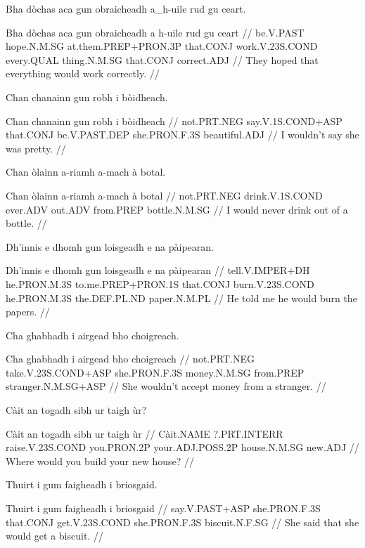 \documentclass[a4paper,10pt]{article}
\begin{document}
\ex
\begingl
\glpre Bha dòchas aca gun obraicheadh a\_h-uile rud gu ceart. 

\vspace{4mm}
\gla Bha dòchas aca gun obraicheadh {a h-uile} rud gu ceart  //
\glb be.V.PAST hope.N.M.SG at.them.PREP+PRON.3P that.CONJ work.V.23S.COND every.QUAL thing.N.M.SG that.CONJ correct.ADJ  //
\glft They hoped that everything would work correctly. //
\endgl
\xe

\ex
\begingl
\glpre Chan chanainn gun robh i bòidheach. 

\vspace{4mm}
\gla Chan chanainn gun robh i bòidheach  //
\glb not.PRT.NEG say.V.1S.COND+ASP that.CONJ be.V.PAST.DEP she.PRON.F.3S beautiful.ADJ  //
\glft I wouldn't say she was pretty. //
\endgl
\xe

\ex
\begingl
\glpre Chan òlainn a-riamh a-mach à botal. 

\vspace{4mm}
\gla Chan òlainn a-riamh a-mach à botal  //
\glb not.PRT.NEG drink.V.1S.COND ever.ADV out.ADV from.PREP bottle.N.M.SG  //
\glft I would never drink out of a bottle. //
\endgl
\xe

\ex
\begingl
\glpre Dh'innis e dhomh gun loisgeadh e na pàipearan. 

\vspace{4mm}
\gla Dh'innis e dhomh gun loisgeadh e na pàipearan  //
\glb tell.V.IMPER+DH he.PRON.M.3S to.me.PREP+PRON.1S that.CONJ burn.V.23S.COND he.PRON.M.3S the.DEF.PL.ND paper.N.M.PL  //
\glft He told me he would burn the papers. //
\endgl
\xe

\ex
\begingl
\glpre Cha ghabhadh i airgead bho choigreach. 

\vspace{4mm}
\gla Cha ghabhadh i airgead bho choigreach  //
\glb not.PRT.NEG take.V.23S.COND+ASP she.PRON.F.3S money.N.M.SG from.PREP stranger.N.M.SG+ASP  //
\glft She wouldn't accept money from a stranger. //
\endgl
\xe

\ex
\begingl
\glpre Càit an togadh sibh ur taigh ùr? 

\vspace{4mm}
\gla Càit an togadh sibh ur taigh ùr  //
\glb Càit.NAME ?.PRT.INTERR raise.V.23S.COND you.PRON.2P your.ADJ.POSS.2P house.N.M.SG new.ADJ  //
\glft Where would you build your new house? //
\endgl
\xe

\ex
\begingl
\glpre Thuirt i gum faigheadh i briosgaid. 

\vspace{4mm}
\gla Thuirt i gum faigheadh i briosgaid  //
\glb say.V.PAST+ASP she.PRON.F.3S that.CONJ get.V.23S.COND she.PRON.F.3S biscuit.N.F.SG  //
\glft She said that she would get a biscuit. //
\endgl
\xe
\end{document}
